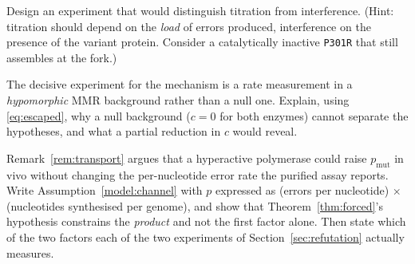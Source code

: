 \begin{exercise}
Design an experiment that would distinguish titration from interference. (Hint:
titration should depend on the \emph{load} of errors produced, interference on
the presence of the variant protein. Consider a catalytically inactive
\texttt{P301R} that still assembles at the fork.)
\end{exercise}

\begin{exercise}[(harder)]
The decisive experiment for the mechanism is a rate measurement in a
\emph{hypomorphic} MMR background rather than a null one. Explain, using
\eqref{eq:escaped}, why a null background ($c = 0$ for both enzymes) cannot
separate the hypotheses, and what a partial reduction in $c$ would reveal.
\end{exercise}

\begin{exercise}[(harder)]
Remark~\ref{rem:transport} argues that a hyperactive polymerase could raise
$p_{\mathrm{mut}}$ in vivo without changing the per-nucleotide error rate the
purified assay reports. Write Assumption~\ref{model:channel} with $p$ expressed
as (errors per nucleotide) $\times$ (nucleotides synthesised per genome), and
show that Theorem~\ref{thm:forced}'s hypothesis constrains the \emph{product} and
not the first factor alone. Then state which of the two factors each of the two
experiments of Section~\ref{sec:refutation} actually measures.
\end{exercise}

